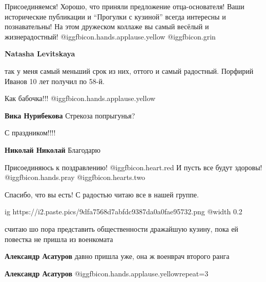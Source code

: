  
 
 
 
 
\zzSecCmt

\begin{itemize} %

Присоединяемся! Хорошо, что приняли предложение отца-основателя! Ваши
исторические публикации и \enquote{Прогулки с кузиной} всегда интересны и
познавательны! На этом дружеском коллаже вы самый весёлый и жизнерадостный!
@igg{fbicon.hands.applause.yellow}  @igg{fbicon.grin} 

\textbf{Natasha Levitskaya} 

так у меня самый меньший срок из них, оттого и самый радостный. Порфирий Иванов
10 лет получил по 58-й.

Как бабочка!!! @igg{fbicon.hands.applause.yellow} 

\textbf{Вика Нурибекова} Стрекоза попрыгунья?

С праздником!!!!

\textbf{Николай Николай} Благодарю


Присоединяюсь к поздравлению!  @igg{fbicon.heart.red} И пусть все будут
здоровы! @igg{fbicon.hands.pray}  @igg{fbicon.hearts.two} 

Спасибо, что вы есть! С радостью читаю все в нашей группе.


\ifcmt
  ig https://i2.paste.pics/9dfa7568d7abfdc9387da0a0fae95732.png
  @width 0.2
\fi


считаю шо пора представить общественности дражайшую кузину, пока ей повестка не
пришла из военкомата

\begin{itemize} %
\textbf{Александр Асатуров} давно пришла уже, она ж военврач второго ранга

\textbf{Александр Асатуров}  @igg{fbicon.hands.applause.yellow}{repeat=3} 
\end{itemize} %


\end{itemize}
